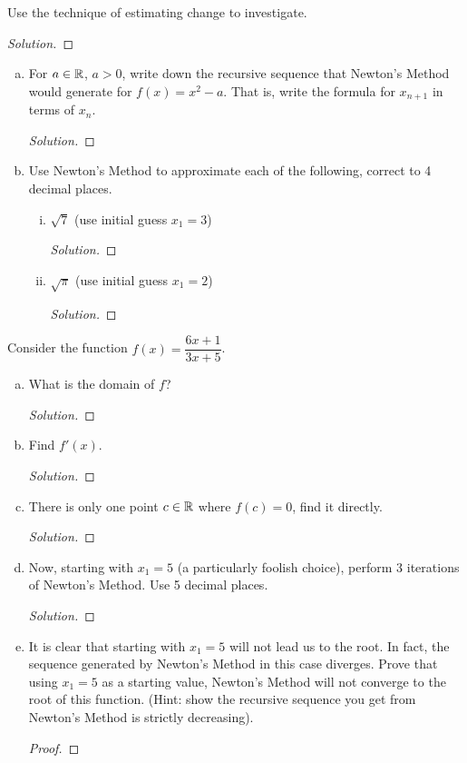 Use the technique of estimating change to investigate.

\begin{proof}[Solution]
\end{proof}


\question \begin{enumerate}[(a)]
  \item For $a\in\mathbb{R}$, $a > 0$, write down the recursive sequence that Newton's Method would generate for $f(x)=x^2-a$.
        That is, write the formula for $x_{n+1}$ in terms of $x_n$.
        \begin{proof}[Solution]
        \end{proof}
  \item Use Newton's Method to approximate each of the following, correct to 4 decimal places.
        \begin{enumerate}[(i)]
          \item $\sqrt{7}$ (use initial guess $x_1=3$)
                \begin{proof}[Solution]
                \end{proof}
          \item $\sqrt{\pi}$ (use initial guess $x_1=2$)
                \begin{proof}[Solution]
                \end{proof}
        \end{enumerate}
\end{enumerate}

\question Consider the function $f(x)=\dfrac{6x+1}{3x+5}$.
\begin{enumerate}[(a)]
  \item What is the domain of $f$?
        \begin{proof}[Solution]
        \end{proof}
  \item Find $f'(x)$.
        \begin{proof}[Solution]
        \end{proof}
  \item There is only one point $c\in\mathbb{R}$ where $f(c) = 0$, find it directly.
        \begin{proof}[Solution]
        \end{proof}
  \item Now, starting with $x_1=5$ (a particularly foolish choice),
        perform 3 iterations of Newton's Method. Use 5 decimal places.
        \begin{proof}[Solution]
        \end{proof}
  \item It is clear that starting with $x_1=5$ will not lead us to the root.
        In fact, the sequence generated by Newton's Method in this case diverges.
        Prove that using $x_1=5$ as a starting value,
        Newton's Method will not converge to the root of this function.
        (Hint: show the recursive sequence you get from Newton's Method is strictly decreasing).
        \begin{proof}
        \end{proof}
\end{enumerate}


